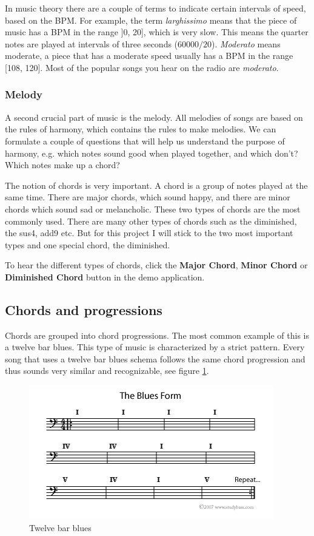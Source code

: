 \documentclass[12pt]{article}
\begin{document}
In music theory there are a couple of terms to indicate certain intervals of speed, based on the BPM. For example, the term \textit{larghissimo} means that the piece of music has a BPM in the range ]0, 20], which is very slow. This means the quarter notes are played at intervals of three seconds ($60000 / 20$). \textit{Moderato} means moderate, a piece that has a moderate speed usually has a BPM in the range [108, 120]. Most of the popular songs you hear on the radio are \textit{moderato}.

\subsubsection{Melody}

A second crucial part of music is the melody. All melodies of songs are based on the rules of harmony, which contains the rules to make melodies. We can formulate a couple of questions that will help us understand the purpose of harmony, e.g. which notes sound good when played together, and which don't? Which notes make up a chord?
\newline

The notion of chords is very important. A chord is a group of notes played at the same time.
There are major chords, which sound happy, and there are minor chords which sound sad or melancholic. These two types of chords are the most commonly used. There are many other types of chords such as the diminished, the sus4, add9 etc. But for this project I will stick to the two most important types and one special chord, the diminished.
\newline

To hear the different types of chords, click the \textbf{Major Chord}, \textbf{Minor Chord} or \textbf{Diminished Chord} button in the demo application. 

\subsection{Chords and progressions}

Chords are grouped into chord progressions. The most common example of this is a twelve bar blues. This type of music is characterized by a strict pattern. Every song that uses a twelve bar blues schema follows the same chord progression and thus sounds very similar and recognizable, see figure \ref{twelvebarblues}.
\newline

\begin{figure}[h]
\centering
\includegraphics[scale=0.8]{img/the-blues-form}
\caption{Twelve bar blues}
\label{twelvebarblues}
\end{figure}
\end{document}
